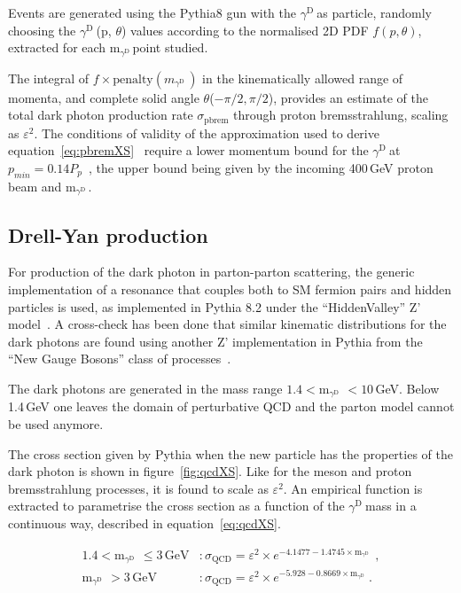 \documentclass[12pt,a4paper,]{article}
\newcommand{\mathDP}{\gamma^{\mathrm{D}}\ }
\newcommand{\mathmDP}{\mathrm{m}_{\mathDP}\ }
\newcommand{\DP}{$\mathDP$}
\newcommand{\mDP}{m$_{\mathDP}$}
\begin{document}
Events are generated using the Pythia8 gun with the \DP as particle,
randomly choosing the \DP(p, $\theta$) values according to the
normalised 2D PDF $f(p, \theta)$, extracted for each \mDP point
studied.

The integral of $f\times\mathrm{penalty}(m_{\mathDP})$ in the
kinematically allowed range of momenta, and complete solid angle
$\theta$($-\pi/2,\pi/2$), provides an estimate of the total dark
photon production rate $\sigma_{\mathrm{pbrem}}$ through proton
bremsstrahlung, scaling as $\varepsilon^2$. The conditions of validity
of the approximation used to derive
equation~\ref{eq:pbremXS}~\cite{KIM1972665, Kim_Tsai_1973} require a
lower momentum bound for the \DP at $p_{min}=0.14
P_p$~\cite{Blumlein:2013cua}, the upper bound being given by the
incoming 400\,GeV proton beam and \mDP.


\subsection{Drell-Yan production}
\label{sec:qcd}

For production of the dark photon in parton-parton scattering, the
generic implementation of a resonance that couples both to SM fermion
pairs and hidden particles is used, as implemented in Pythia 8.2 under
the ``HiddenValley'' Z' model~\cite{Carloni:2011kk}. A cross-check
has been done that similar kinematic distributions for the dark
photons are found using another Z' implementation in Pythia from
the ``New Gauge Bosons'' class of processes~\cite{Ciobanu:2005pv}.

The dark photons are generated in the mass range $1.4 < \mathmDP <
10$\,GeV. Below 1.4\,GeV one leaves the domain of perturbative QCD and
the parton model cannot be used anymore.

The cross section given by Pythia when the new particle has the
properties of the dark photon is shown in figure~\ref{fig:qcdXS}. Like
for the meson and proton bremsstrahlung processes, it is found to
scale as $\varepsilon^2$. An empirical function is extracted to
parametrise the cross section as a function of the \DP mass in a
continuous way, described in equation~\ref{eq:qcdXS}.

\begin{align}
  1.4 < \mathmDP \leq 3\,\mathrm{GeV} & : \sigma_{\mathrm{QCD}} =  \varepsilon^2 \times e^{-4.1477-1.4745\times \mathmDP}\,, \label{eq:qcdXS} \\
  \mathmDP > 3\,\mathrm{GeV} & : \sigma_{\mathrm{QCD}} =  \varepsilon^2 \times e^{-5.928-0.8669\times \mathmDP}. \nonumber
\end{align}
\end{document}
